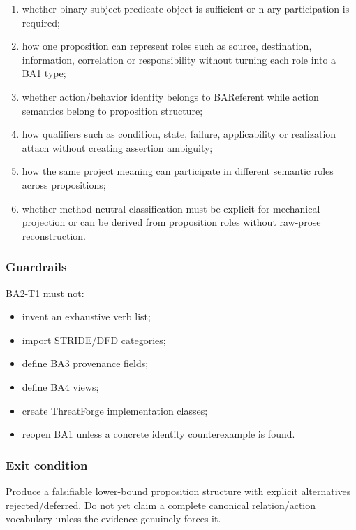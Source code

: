 \documentclass[
  10pt,
  a4paper,
]{article}
\providecommand{\tightlist}{%
  \setlength{\itemsep}{0pt}\setlength{\parskip}{0pt}}
\begin{document}
\begin{enumerate}
\def\labelenumi{\arabic{enumi}.}
\tightlist
\item
  whether binary subject-predicate-object is sufficient or n-ary
  participation is required;
\item
  how one proposition can represent roles such as source, destination,
  information, correlation or responsibility without turning each role
  into a BA1 type;
\item
  whether action/behavior identity belongs to BAReferent while action
  semantics belong to proposition structure;
\item
  how qualifiers such as condition, state, failure, applicability or
  realization attach without creating assertion ambiguity;
\item
  how the same project meaning can participate in different semantic
  roles across propositions;
\item
  whether method-neutral classification must be explicit for mechanical
  projection or can be derived from proposition roles without raw-prose
  reconstruction.
\end{enumerate}

\subsubsection{Guardrails}\label{guardrails}

BA2-T1 must not:

\begin{itemize}
\tightlist
\item
  invent an exhaustive verb list;
\item
  import STRIDE/DFD categories;
\item
  define BA3 provenance fields;
\item
  define BA4 views;
\item
  create ThreatForge implementation classes;
\item
  reopen BA1 unless a concrete identity counterexample is found.
\end{itemize}

\subsubsection{Exit condition}\label{exit-condition}

Produce a falsifiable lower-bound proposition structure with explicit
alternatives rejected/deferred. Do not yet claim a complete canonical
relation/action vocabulary unless the evidence genuinely forces it.
\end{document}
